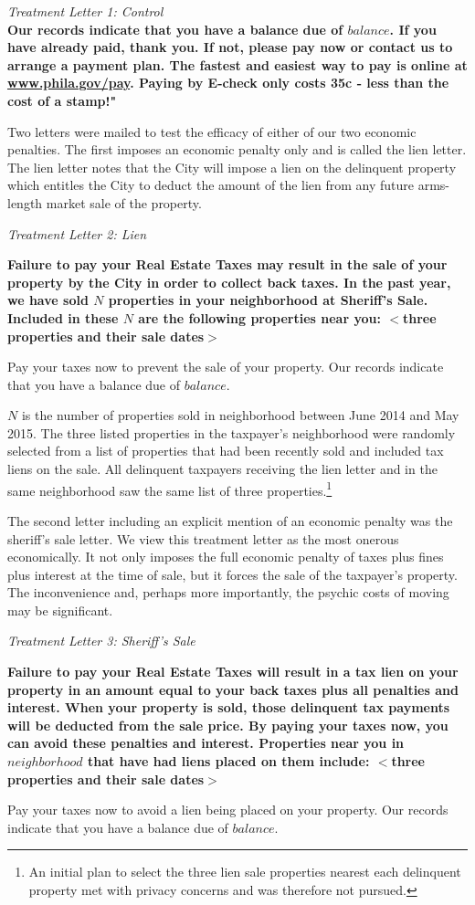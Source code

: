 \documentclass[12pt]{article}
\begin{document}
{\it Treatment Letter 1: Control } \\ {\bf Our records indicate that
  you have a balance due of $balance$.  If you have already paid,
  thank you. If not, please pay now or contact us to arrange a payment
  plan. The fastest and easiest way to pay is online at
  \underline{www.phila.gov/pay}. Paying by E-check only costs 35c -
  less than the cost of a stamp!"}

Two letters were mailed to test the efficacy of either of our two
economic penalties.  The first imposes an economic penalty only and is
called the lien letter.  The lien letter notes that the City will
impose a lien on the delinquent property which entitles the City to
deduct the amount of the lien from any future arms-length market sale
of the property.
        
{\it Treatment Letter 2: Lien } \\ {\bf Failure to pay your Real
  Estate Taxes may result in the sale of your property by the City in
  order to collect back taxes. In the past year, we have sold $N$
  properties in your neighborhood at Sheriff's Sale. Included in these
  $N$ are the following properties near you: $<$three properties and
  their sale dates$>$

  Pay your taxes now to prevent the sale of your property.  Our
  records indicate that you have a balance due of $balance$.}

$N$ is the number of properties sold in neighborhood between June 2014
and May 2015. The three listed properties in the taxpayer's
neighborhood were randomly selected from a list of properties that had
been recently sold and included tax liens on the sale.  All delinquent
taxpayers receiving the lien letter and in the same neighborhood saw
the same list of three properties.\footnote{An initial plan to select
  the three lien sale properties nearest each delinquent property met
  with privacy concerns and was therefore not pursued.}

The second letter including an explicit mention of an economic penalty
was the sheriff's sale letter.  We view this treatment letter as the
most onerous economically.  It not only imposes the full economic
penalty of taxes plus fines plus interest at the time of sale, but it
forces the sale of the taxpayer's property.  The inconvenience and,
perhaps more importantly, the psychic costs of moving may be
significant.  
	
{\it Treatment Letter 3: Sheriff's Sale} \\ {\bf Failure to pay your
  Real Estate Taxes will result in a tax lien on your property in an
  amount equal to your back taxes plus all penalties and
  interest. When your property is sold, those delinquent tax payments
  will be deducted from the sale price. By paying your taxes now, you
  can avoid these penalties and interest. Properties near you in
  $neighborhood$ that have had liens placed on them include: $<$three
  properties and their sale dates$>$

  Pay your taxes now to avoid a lien being placed on your property.
  Our records indicate that you have a balance due of $balance$.}
	
\end{document}
